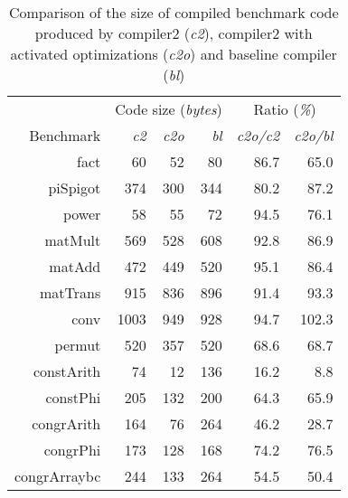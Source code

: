 \begin{table}[H]
\centering
\begin{tabular}{r r r r r r}
\toprule
~ & \multicolumn{3}{c}{Code size (\textit{bytes})} & \multicolumn{2}{c}{Ratio (\textit{\%})} \\
Benchmark & \textit{c2} & \textit{c2o} & \textit{bl} & \textit{c2o/c2} & \textit{c2o/bl} \\
\midrule
fact	 & 	60	 & 	52	 & 	80	 & 	86.7	 & 	65.0	 \\
piSpigot	 & 	374	 & 	300	 & 	344	 & 	80.2	 & 	87.2	 \\
power	 & 	58	 & 	55	 & 	72	 & 	94.5	 & 	76.1	 \\
matMult	 & 	569	 & 	528	 & 	608	 & 	92.8	 & 	86.9	 \\
matAdd	 & 	472	 & 	449	 & 	520	 & 	95.1	 & 	86.4	 \\
matTrans	 & 	915	 & 	836	 & 	896	 & 	91.4	 & 	93.3	 \\
conv	 & 	1003	 & 	949	 & 	928	 & 	94.7	 & 	102.3	 \\
permut	 & 	520	 & 	357	 & 	520	 & 	68.6	 & 	68.7	 \\
constArith	 & 	74	 & 	12	 & 	136	 & 	16.2	 & 	8.8	 \\
constPhi	 & 	205	 & 	132	 & 	200	 & 	64.3	 & 	65.9	 \\
congrArith	 & 	164	 & 	76	 & 	264	 & 	46.2	 & 	28.7	 \\
congrPhi	 & 	173	 & 	128	 & 	168	 & 	74.2	 & 	76.5	 \\
congrArraybc	 & 	244	 & 	133	 & 	264	 &	54.5	 & 	50.4	 \\
\bottomrule
\end{tabular}
\caption{Comparison of the size of compiled benchmark code produced by compiler2 (\textit{c2}), compiler2 with activated optimizations (\textit{c2o}) and baseline compiler (\textit{bl})}
\label{tab:evaluation:code-size}
\end{table}

